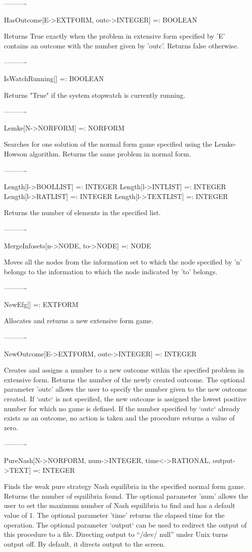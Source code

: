 ----------

HasOutcome[E->EXTFORM, outc->INTEGER] =: BOOLEAN

	Returns True exactly when the problem in extensive form specified by 
'E' contains an outcome with the number given by 'outc'.  Returns false 
otherwise.

----------

IsWatchRunning[] =: BOOLEAN

	Returns "True" if the system stopwatch is currently running.

----------

Lemke[N->NORFORM] =: NORFORM

	Searches for one solution of the normal form game specified using the
Lemke-Howson algorithm.  Returns the same problem in normal form.	

----------

Length[l->BOOLLIST] =: INTEGER
Length[l->INTLIST] =: INTEGER
Length[l->RATLIST] =: INTEGER
Length[l->TEXTLIST] =: INTEGER

	Returns the number of elements in the specified list.

----------

MergeInfosets[n->NODE, to->NODE] =: NODE

	Moves all the nodes from the information set to which the node
specified by 'n' belongs to the information to which the node indicated by 'to'
belongs.

----------

NewEfg[] =: EXTFORM

	Allocates and returns a new extensive form game.

----------

NewOutcome[E->EXTFORM, {outc->INTEGER}] =: INTEGER

	Creates and assigns a number to a new outcome within the specified 
problem in extensive form.  Returns the number of the newly created outcome.
The optional parameter 'outc' allows the user to specify the number given to 
the new outcome created.  If `outc` is not specified, the new outcome is
assigned the lowest positive number for which no game is defined.  If the 
number specified by `outc` already exists as an outcome, no action is taken and
the procedure returns a value of zero.

----------

PureNash[N->NORFORM, {num->INTEGER}, {time<->RATIONAL}, {output->TEXT}]
	 =: INTEGER

	Finds the weak pure strategy Nash equilibria in the specified normal 
form game.  Returns the number of equilibria found.  The optional parameter 
'num' allows the user to set the maximum number of Nash equilibria to find and 
has a default value of 1.  The optional parameter 'time' returns the elapsed 
time for the operation.  The optional parameter `output` can be used to
redirect the output of this procedure to a file.  Directing output to ``/dev/
null'' under Unix turns output off.  By default, it directs output to the
screen.

